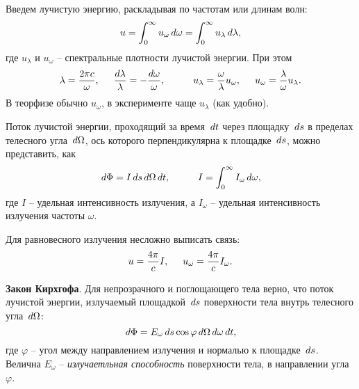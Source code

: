 



Введем лучистую энергию, раскладывая по частотам или длинам волн:
\begin{equation*}
    u = \int_0^\infty u_\omega \, d \omega = \int_{0}^{\infty} u_\lambda \, d \lambda,
\end{equation*}
где $u_\lambda$ и $u_\omega$ -- спектральные плотности лучистой энергии. При этом
\begin{equation*}
    \lambda = \frac{2 \pi c}{\omega},
    \hspace{5 mm} 
    \frac{d \lambda}{\lambda} = - \frac{d \omega}{\omega},
    \hspace{10 mm} 
    u_\lambda = \frac{\omega}{\lambda} u_\omega,
    \hspace{5 mm} 
    u_\omega = \frac{\lambda}{\omega}  u_\lambda.
\end{equation*}
В теорфизе обычно $u_\omega$, в эксперименте чаще $u_\lambda$ (как удобно). 

Поток лучистой энергии, проходящий за время $\, d t$ через площадку $\, d s$ в пределах телесного угла $\, d \Omega$, ось которого перпендикулярна к площадке $\, d s$, можно представить, как
\begin{equation*}
    \d \Phi = I \d s \d \Omega \d t,
    \hspace{10 mm} 
    I = \int_{0}^{\infty} I_\omega \d \omega,
\end{equation*}
где $I$ -- удельная интенсивность излучения, а $I_\omega$ -- удельная интенсивность излучения частоты $\omega$. 


Для равновесного излучения несложно выписать связь:
\begin{equation*}
    u = \frac{4 \pi}{c} I,
    \hspace{5 mm} 
    u_\omega = \frac{4 \pi}{c} I_\omega. 
\end{equation*}



\textbf{Закон Кирхгофа}. Для непрозрачного и поглощающего тела верно, что поток лучистой энергии, излучаемый площадкой $\, d s$ поверхности тела внутрь телесного угла $\, d \Omega$:
\begin{equation*}
    \, d \Phi = E_\omega \, d s \cos \varphi \, d \Omega \, d \omega \, d t,
\end{equation*}
где $\varphi$ -- угол между направлением излучения и нормалью к площадке $\, d s$. Велична $E_\omega$ -- \textit{излучаетльная способность} поверхности тела, в направлении угла $\varphi$. 


